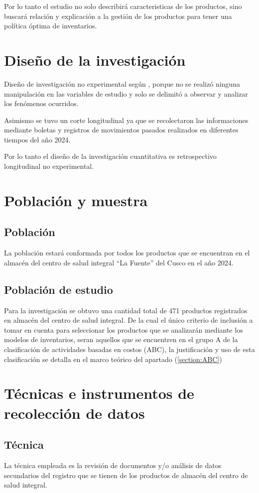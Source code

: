 Por lo tanto el estudio no solo describirá caracteristicas de los productos, sino buscará relación y explicación a la gestión de los productos para tener una política óptima de inventarios. \citep{hernandez2020metodologia}

\section{Diseño de la investigación}
Diseño de investigación no experimental según \cite{hernandez2020metodologia}, porque no se realizó ninguna manipulación en las variables de estudio y solo se delimitó a observar y analizar los fenómenos ocurridos.

Asimismo se tuvo un corte longitudinal ya que se recolectaron las informaciones mediante boletas y registros de movimientos pasados realizados en diferentes tiempos del año 2024.

Por lo tanto el diseño de la investigación cuantitativa es retrospectivo longitudinal no experimental.

\section{Población y muestra}
\subsection{Población}
La población estará conformada por todos los productos que se encuentran en el almacén del centro de salud integral ``La Fuente'' del Cusco en el año 2024.

\subsection{Población de estudio}
Para la investigación se obtuvo una cantidad total de 471 productos registrados en almacén del centro de salud integral. De la cual el único criterio de inclusión a tomar en cuenta para seleccionar los productos que se analizarán mediante los modelos de inventarios, seran aquellos que se encuentren en el grupo A de la clasificación de actividades basadas en costos (ABC), la justificación y uso de esta clasificación se detalla en el marco teórico del apartado (\ref{section:ABC})

\section{Técnicas e instrumentos de recolección de datos}
\subsection{Técnica}
La técnica empleada es la revisión de documentos y/o análisis de datos secundarios del registro que se tienen de los productos de almacén del centro de salud integral.

